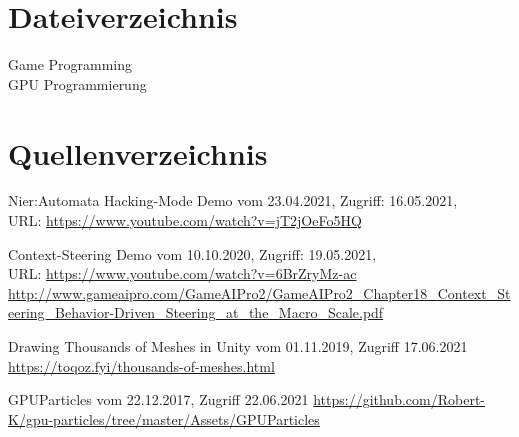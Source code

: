 \documentclass[a4paper,ngerman,12pt]{report}
\begin{document}
\chapter{Dateiverzeichnis}


\begin{flushleft}%
\parbox{0.5\linewidth}{
}%
\parbox{0.4\linewidth}{
    {\color{cGPR} Game Programming} \\
    {\color{cGPU} GPU Programmierung}
}%
\end{flushleft}






\chapter{Quellenverzeichnis}

\begin{thebibliography}{999}

 Nier:Automata Hacking-Mode Demo vom 23.04.2021,  Zugriff:  16.05.2021, \\ URL:
\url{https://www.youtube.com/watch?v=jT2jOeFo5HQ}

 Context-Steering Demo vom 10.10.2020,  Zugriff:  19.05.2021, \\ URL:
\url{https://www.youtube.com/watch?v=6BrZryMz-ac}
\url{http://www.gameaipro.com/GameAIPro2/GameAIPro2_Chapter18_Context_Steering_Behavior-Driven_Steering_at_the_Macro_Scale.pdf}

 Drawing Thousands of Meshes in Unity vom 01.11.2019, Zugriff 17.06.2021
\url{https://toqoz.fyi/thousands-of-meshes.html}

 GPUParticles vom 22.12.2017, Zugriff 22.06.2021
\url{https://github.com/Robert-K/gpu-particles/tree/master/Assets/GPUParticles}

\end{thebibliography}
\end{document}
